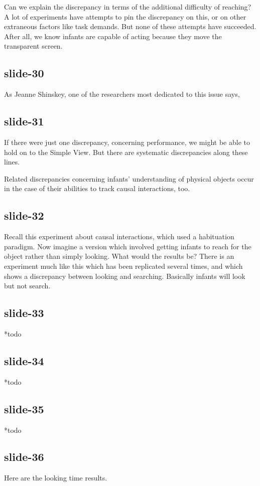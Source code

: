 \documentclass[12pt,\papersize]{extarticle}
\begin{document}
Can we explain the discrepancy in terms of the additional difficulty of reaching?
A lot of experiments have attempts to pin the discrepancy on this, or on other extraneous factors like task demands.
But none of these attempts have succeeded.
After all, we know infants are capable of acting because they move the transparent screen.

\subsection{slide-30}
As Jeanne Shinskey, one of the researchers most dedicated to this issue says,

\subsection{slide-31}
If there were just one discrepancy, concerning performance, we might be able to hold on to the
Simple View.  But there are systematic discrepancies along these lines.

Related discrepancies concerning infants' understanding of physical objects occur in the case
of their abilities to track causal interactions, too.

\subsection{slide-32}
Recall this experiment about causal interactions, which used a habituation paradigm.
Now imagine a version which involved getting infants to reach for the object rather than simply looking.
What would the results be?
There is an experiment much like this which has been replicated several times, and which shows
a discrepancy between looking and searching.
Basically infants will look but not search.

\subsection{slide-33}
*todo

\subsection{slide-34}
*todo

\subsection{slide-35}
*todo

\subsection{slide-36}
Here are the looking time results.
\end{document}
